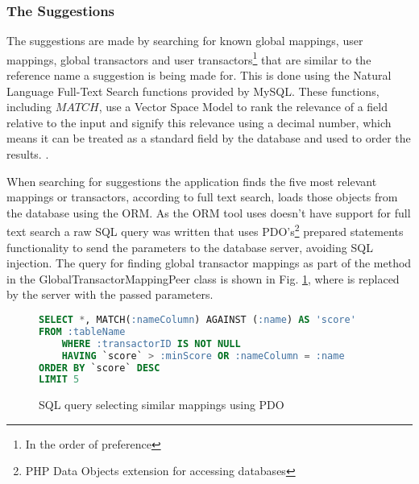 \subsubsection{The Suggestions} \label{sec:suggestionimplementation}
The suggestions are made by searching for known global mappings, user mappings, global transactors and user transactors\footnote{In the order of preference} that are similar to the reference name a suggestion is being made for. This is done using the Natural Language Full-Text Search functions provided by MySQL. These functions, including \inlinesql$MATCH$, use a Vector Space Model to rank the relevance of a field relative to the input and signify this relevance using a decimal number, which means it can be treated as a standard field by the database and used to order the results.  \parencite{mysql2014searches}. 

When searching for suggestions the application finds the five most relevant mappings or transactors, according to full text search, loads those objects from the database using the ORM. As the ORM tool uses doesn't have support for full text search a raw SQL query was written that uses PDO's\footnote{PHP Data Objects extension for accessing databases} prepared statements functionality to send the parameters to the database server, avoiding SQL injection. The query for finding global transactor mappings as part of the  method in the GlobalTransactorMappingPeer class is shown in Fig. \ref{fig:sql-match-query}, where  is replaced by the server with the passed parameters.

\begin{figure}
\centering
\lstset{style=phpcolor}
\begin{lstlisting}[language=sql]
SELECT *, MATCH(:nameColumn) AGAINST (:name) AS 'score'
FROM :tableName
	WHERE :transactorID IS NOT NULL
	HAVING `score` > :minScore OR :nameColumn = :name
ORDER BY `score` DESC
LIMIT 5
\end{lstlisting}
\caption{SQL query selecting similar mappings using PDO}
\label{fig:sql-match-query}
\end{figure}

